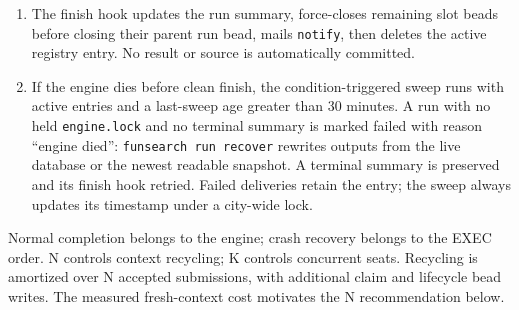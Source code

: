 \documentclass[11pt]{article}
\newcommand{\code}[1]{\texttt{#1}}
\begin{document}
\begin{enumerate}
leave that marker unpublished so recovery can retry. It backs up SQLite and invokes the
finish hook with the run directory and \code{FS\_RUN\_DIR} set, then exits.
\item The finish hook updates the run summary, force-closes remaining slot
beads before closing their parent run bead, mails \code{notify}, then deletes
the active registry entry. No result or source is automatically committed.
\item If the engine dies before clean finish, the condition-triggered sweep runs
with active entries and a last-sweep age greater than 30 minutes. A run with
no held \code{engine.lock} and no terminal summary is marked failed with reason ``engine died'':
\code{funsearch run recover} rewrites outputs from the live database or the newest
readable snapshot. A terminal summary is preserved and its finish
hook retried. Failed deliveries retain the entry; the sweep always updates its
timestamp under a city-wide lock.
\end{enumerate}
Normal completion belongs to the engine; crash recovery belongs to the EXEC
order. N controls context recycling; K controls concurrent seats. Recycling is
amortized over N accepted submissions, with additional claim and lifecycle bead
writes. The measured fresh-context cost motivates the N recommendation below.
\end{document}

